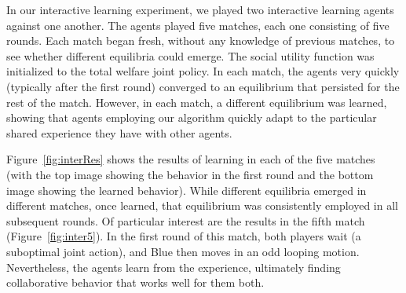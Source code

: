 In our interactive learning experiment,
we played two interactive learning agents against one another.  The
agents played five matches, each one consisting of five rounds.  Each
match began fresh, without any knowledge of previous matches, to see
whether different equilibria could emerge.  The social utility
function was initialized to the total welfare joint policy.  In each
match, the agents very quickly (typically after the first round)
converged to an equilibrium that persisted for the rest of the match.
However, in each match, a different equilibrium was learned, showing
that agents employing our algorithm quickly adapt to the particular
shared experience they have with other agents.

Figure~\ref{fig:interRes} shows the results of learning in each of the
five matches (with the top image showing the behavior in the first
round and the bottom image showing the learned behavior). While
different equilibria emerged in different matches, once learned, that
equilibrium was consistently employed in all subsequent rounds.  Of
particular interest are the results in the fifth match
(Figure~\ref{fig:inter5}). In the first round of this match, both
players wait (a suboptimal joint action), and Blue then moves in an
odd looping motion. Nevertheless, the agents learn from the experience,
ultimately finding collaborative behavior that works well for them both.


